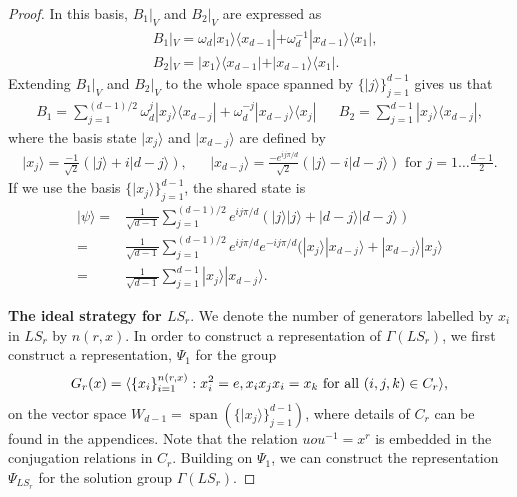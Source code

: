 \documentclass[11pt,letterpaper]{article}
\newcommand{\ket}[1]{|#1\rangle}
\newcommand{\ketbra}[2]{|#1\rangle\langle#2|}
\DeclarePairedDelimiter{\ip}{\langle}{\rangle}
\DeclareMathOperator{\spn}{span}
\newcommand{\1}{\mathbb{1}}
\newcommand{\LS}{LS}
\theoremstyle{definition}
\begin{document}
\begin{proof}
In this basis, $B_1|_V$ and $B_2|_V$ are expressed as 
\begin{align}
	&B_1|_V = \omega_d\ketbra{x_1}{x_{d-1}} + \omega_d^{-1} \ketbra{x_{d-1}}{x_1},\\
	&B_2|_V =\ketbra{x_1}{x_{d-1}}  + \ketbra{x_{d-1}}{x_1}.
\end{align}
Extending $B_1|_V$ and $B_2|_V$ to the whole space spanned by $\{ \ket{j} \}_{j=1}^{d-1}$ gives us that
\begin{align}
	B_1 =\sum_{j=1}^{(d-1)/2} \omega_d^j \ketbra{x_j}{x_{d-j}} + \omega_d^{-j} \ketbra{x_{d-j}}{x_{j}} &&
	B_2 = \sum_{j=1}^{d-1} \ketbra{x_j}{x_{d-j}},
\end{align}
where the basis state $\ket{x_j}$ and $\ket{x_{d-j}}$ are defined by
\begin{align}
	\ket{x_j} = \frac{-1}{\sqrt{2}}(\ket{j} + i\ket{d-j}), &&
	\ket{x_{d-j}} = \frac{-e^{ij\pi/d}}{\sqrt{2}}(\ket{j} - i\ket{d-j}) \text{ for } j = 1 \dots \frac{d-1}{2}.
\end{align}
If we use the basis $\{ \ket{x_j} \}_{j=1}^{d-1}$, the shared state is 
\begin{align}
	\ket{\psi} =& \frac{1}{\sqrt{d-1}} \sum_{j=1}^{(d-1)/2} e^{ij\pi/d}(\ket{j}\ket{j} + \ket{d-j}\ket{d-j})\\
	=& \frac{1}{\sqrt{d-1}} \sum_{j=1}^{(d-1)/2}  e^{ij\pi/d}e^{-ij\pi/d} (\ket{x_{j}}\ket{x_{d-j}} + \ket{x_{d-j}}\ket{x_{j}} \\
	=& \frac{1}{\sqrt{d-1}} \sum_{j=1}^{d-1} \ket{x_j} \ket{x_{d-j}}.
\end{align}

\textbf{The ideal strategy for $\LS_r$}.
We denote the number of generators labelled by $x_i$ in $\LS_r$ by $n(r,x)$.
In order to construct a representation of $\Gamma(\LS_r)$, we first construct a representation, $\Psi_1$ for the group 
\begin{align}
	G_r(x) = \ip{ \{x_i\}_{i=1}^{n(r,x)}: x_i^2 = e, x_i x_j x_i = x_k \text{ for all } (i,j,k) \in C_r},
\end{align}
on the vector space $W_{d-1} = \spn(\{ \ket{x_j} \}_{j=1}^{d-1})$,
where details of $C_r$ can be found in the appendices. 
Note that the relation $uou^{-1} = x^r$ is embedded in the conjugation relations in $C_r$.
Building on $\Psi_1$, we can construct 
the representation $\Psi_{\LS_r}$ for the solution group $\Gamma(\LS_r)$.


\end{proof}
\end{document}
